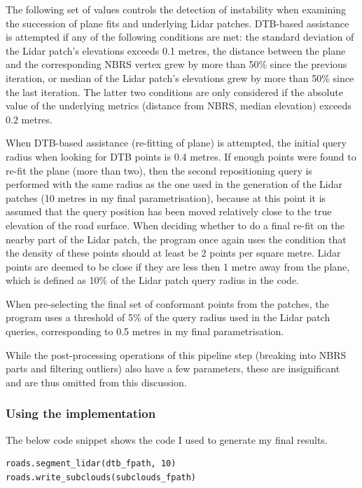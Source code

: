 The following set of values controls the detection of instability when examining the succession of plane fits and underlying Lidar patches. DTB-based assistance is attempted if any of the following conditions are met: the standard deviation of the Lidar patch's elevations exceeds 0.1 metres, the distance between the plane and the corresponding NBRS vertex grew by more than 50\% since the previous iteration, or median of the Lidar patch's elevations grew by more than 50\% since the last iteration. The latter two conditions are only considered if the absolute value of the underlying metrics (distance from NBRS, median elevation) exceeds 0.2 metres.

When DTB-based assistance (re-fitting of plane) is attempted, the initial query radius when looking for DTB points is 0.4 metres. If enough points were found to re-fit the plane (more than two), then the second repositioning query is performed with the same radius as the one used in the generation of the Lidar patches (10 metres in my final parametrisation), because at this point it is assumed that the query position has been moved relatively close to the true elevation of the road surface. When deciding whether to do a final re-fit on the nearby part of the Lidar patch, the program once again uses the condition that the density of these points should at least be 2 points per square metre. Lidar points are deemed to be close if they are less then 1 metre away from the plane, which is defined as 10\% of the Lidar patch query radius in the code.

When pre-selecting the final set of conformant points from the patches, the program uses a threshold of 5\% of the query radius used in the Lidar patch queries, corresponding to 0.5 metres in my final parametrisation.

While the post-processing operations of this pipeline step (breaking into NBRS parts and filtering outliers) also have a few parameters, these are insignificant and are thus omitted from this discussion.

\subsubsection{Using the implementation}

The below code snippet shows the code I used to generate my final results.

\begin{lstlisting}
roads.segment_lidar(dtb_fpath, 10)
roads.write_subclouds(subclouds_fpath)
\end{lstlisting}

